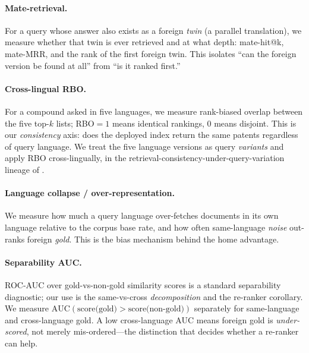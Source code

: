\documentclass[11pt]{article}
\begin{document}
\paragraph{Mate-retrieval.}
For a query whose answer also exists as a foreign \emph{twin} (a parallel
translation), we measure whether that twin is ever retrieved and at what depth:
mate-hit@k, mate-MRR, and the rank of the first foreign twin. This isolates
``can the foreign version be found at all'' from ``is it ranked first.''

\paragraph{Cross-lingual RBO.}
For a compound asked in five languages, we measure rank-biased overlap
\citep{rbo2010} between the five top-$k$ lists; RBO$=1$ means identical
rankings, $0$ means disjoint. This is our \emph{consistency} axis: does the
deployed index return the same patents regardless of query language. We treat
the five language versions as query \emph{variants} and apply RBO
cross-lingually, in the retrieval-consistency-under-query-variation lineage of
\citet{bailey2017consistency}.

\paragraph{Language collapse / over-representation.}
We measure how much a query language over-fetches documents in its own
language relative to the corpus base rate, and how often same-language
\emph{noise} out-ranks foreign \emph{gold}. This is the bias mechanism behind
the home advantage.

\paragraph{Separability AUC.}
ROC-AUC over gold-vs-non-gold similarity scores is a standard separability
diagnostic; our use is the same-vs-cross \emph{decomposition} and the re-ranker
corollary. We measure $\mathrm{AUC}(\text{score(gold)} > \text{score(non-gold)})$
separately for same-language and cross-language gold. A low cross-language AUC
means foreign gold is \emph{under-scored}, not merely mis-ordered---the
distinction that decides whether a re-ranker can help.
\end{document}
